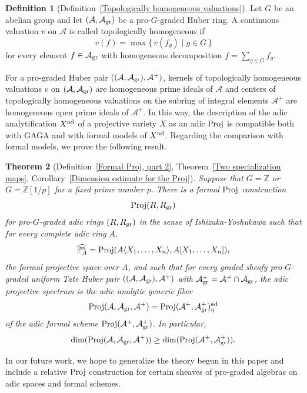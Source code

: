 \documentclass[12pt,twoside,a4paper]{article}
\newtheorem{thm}{Theorem}[section]
\theoremstyle{definition}
\newtheorem{mydef}[thm]{Definition}
\theoremstyle{remark}
\newcommand\ad{{\rm ad}}
\newcommand\gr{{\rm gr}}
\newcommand\Proj{{\rm Proj}}
\begin{document}
\begin{mydef}[Definition~\ref{Topologically homogeneous valuations}]Let $G$ be an abelian group and let $(\mathcal{A}, \mathcal{A}_{\gr})$ be a pro-$G$-graded Huber ring. A continuous valuation $v$ on $\mathcal{A}$ is called topologically homogeneous if  \begin{equation*}v(f)=\max\{\, v(f_{g})\mid g\in G\,\}\end{equation*}for every element $f\in \mathcal{A}_{\gr}$ with homogeneous decomposition $f=\sum_{g\in G}f_{g}$. \end{mydef}
For a pro-graded Huber pair $((\mathcal{A}, \mathcal{A}_{\gr}), \mathcal{A}^{+})$, kernels of topologically homogeneous valuations $v$ on $(\mathcal{A}, \mathcal{A}_{\gr})$ are homogeneous prime ideals of $\mathcal{A}$ and centers of topologically homogeneous valuations on the subring of integral elements $\mathcal{A}^{+}$ are homogeneous open prime ideals of $\mathcal{A}^{+}$. In this way, the description of the adic analytification $X^{\ad}$ of a projective variety $X$ as an adic $\Proj$ is compatible both with GAGA and with formal models of $X^{\ad}$. Regarding the comparison with formal models, we prove the following result. 
\begin{thm}[Definition~\ref{Formal Proj, part 2}, Theorem~\ref{Two specialization maps}, Corollary~\ref{Dimension estimate for the Proj}]\label{Main theorem 2}Suppose that $G=\mathbb{Z}$ or $G=\mathbb{Z}[1/p]$ for a fixed prime number $p$. There is a formal $\Proj$ construction \begin{equation*}\Proj(R, R_{\gr})\end{equation*}for pro-$G$-graded adic rings $(R, R_{\gr})$ in the sense of Ishizuka-Yoshukawa \cite{Ishizuka-Yoshikawa25} such that for every complete adic ring $A$, \begin{equation*}\widehat{\mathbb{P}_{A}^{n}}=\Proj(A\langle X_1,\dots, X_n\rangle, A[X_1,\dots, X_n]),\end{equation*}the formal projective space over $A$, and such that for every graded sheafy pro-$G$-graded uniform Tate Huber pair $((\mathcal{A}, \mathcal{A}_{\gr}), \mathcal{A}^{+})$ with $\mathcal{A}_{\gr}^{+}=\mathcal{A}^{+}\cap \mathcal{A}_{\gr}$, the adic projective spectrum is the adic analytic generic fiber \begin{equation*}\Proj(\mathcal{A}, \mathcal{A}_{\gr}, \mathcal{A}^{+})=\Proj(\mathcal{A}^{+}, \mathcal{A}_{\gr}^{+})_{\eta}^{\ad}\end{equation*}of the adic formal scheme $\Proj(\mathcal{A}^{+}, \mathcal{A}_{\gr}^{+})$. In particular, \begin{equation*}\dim(\Proj(\mathcal{A}, \mathcal{A}_{\gr}, \mathcal{A}^{+}))\geq \dim(\Proj(\mathcal{A}^{+}, \mathcal{A}_{\gr}^{+})).\end{equation*} \end{thm}
In our future work, we hope to generalize the theory begun in this paper and include a relative $\Proj$ construction for certain sheaves of pro-graded algebras on adic spaces and formal schemes. 
\end{document}

